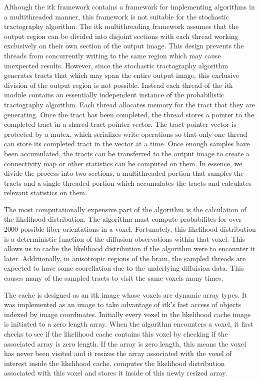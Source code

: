 Although the itk framework contains a framework for implementing algorithms in a multithreaded manner, this framework is not suitable for the stochastic tractography algorithm.  The itk multithreading framework assumes that the output region can be divided into disjoint sections with each thread working exclusively on their own section of the output image.  This design prevents the threads from concurrently writing to the same region which may cause unexpected results.  However, since the stochastic tractography algorithm generates tracts that which may span the entire output image, this exclusive division of the output region is not possible.  Instead each thread of the itk module contains an essentially independent instance of the probabilistic tractography algorithm. Each thread allocates memory for the tract that they are generating.  Once the tract has been completed, the thread stores a pointer to the completed tract in a shared tract pointer vector.  The tract pointer vector is protected by a mutex, which serializes write operations so that only one thread can store its completed tract in the vector at a time.  Once enough samples have been accumulated, the tracts can be transferred to the output image to create a connectivity map or other statistics can be computed on them.  In essence, we divide the process into two sections, a multithreaded portion that samples the tracts and a single threaded portion which accumulates the tracts and calculates relevant statistics on them.

The most computationally expensive part of the algorithm is the calculation of the likelihood distribution.  The algorithm must compute probabilites for over 2000 possible fiber orientations in a voxel.  Fortunately, this likelihood distribution is a deterministic function of the diffusion observations within that voxel.  This allows us to cache the likelihood distribution if the algorithm were to encounter it later.  Additionally, in anisotropic regions of the brain, the sampled threads are expected to have some coorellation due to the underlying diffuision data.  This causes many of the sampled tracts to visit the same voxels many times.  

The cache is designed as an itk image whose voxels are dynamic array types.  It was implemented as an image to take advantage of itk's fast access of objects indexed by image coordinates.  Initially every voxel in the likelihood cache image is initiated to a zero length array.  When the algorithm encounters a voxel, it first checks to see if the likelihood cache contains this voxel by checking if the associated array is zero length.  If the array is zero length, this means the voxel has never been visited and it resizes the array associated with the voxel of interest inside the likelihood cache, computes the likelihood distribution associated with this voxel and stores it inside of this newly resized array.

